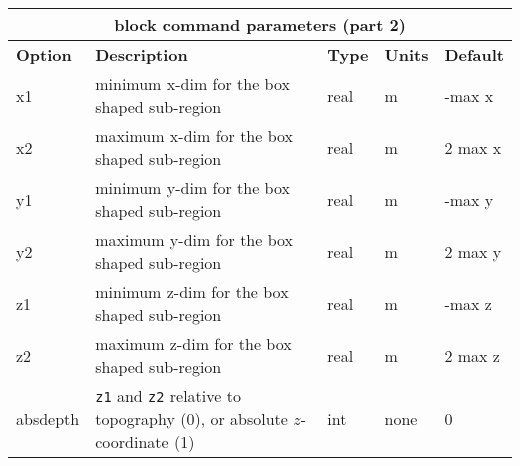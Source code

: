 \documentclass[11pt]{report}
\begin{document}
\begin{center}
\begin{tabular}{|l|p{8cm}|l|l|l|} \hline
\multicolumn{5}{|c|}{\bf block command parameters (part 2)}\\ \hline
{\bf Option} & {\bf Description}          & {\bf Type} & {\bf Units} & {\bf Default} \\ \hline 
\hline
x1          & minimum x-dim for the box shaped sub-region & real & m & -max x \\ \hline
x2          & maximum x-dim for the box shaped sub-region & real & m & 2 max x \\ \hline
\hline
y1          & minimum y-dim for the box shaped sub-region & real & m & -max y \\ \hline
y2          & maximum y-dim for the box shaped sub-region & real & m & 2 max y \\ \hline
\hline
z1          & minimum z-dim for the box shaped sub-region & real & m & -max z \\ \hline
z2          & maximum z-dim for the box shaped sub-region & real & m & 2 max z \\ \hline
\hline
absdepth    & {\tt z1} and {\tt z2} relative to topography (0), or absolute $z$-coordinate (1) & int
& none & 0 \\ \hline 
\end{tabular}
\end{center}
%

\end{document}

